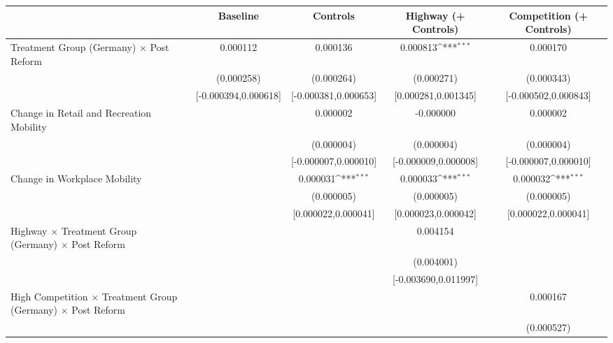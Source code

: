 {
\def\sym#1{\ifmmode^{#1}\else\(^{#1}\)\fi}
\begin{tabular}{l*{4}{c}}
\toprule
                    &\multicolumn{1}{c}{Baseline}&\multicolumn{1}{c}{Controls}&\multicolumn{1}{c}{Highway (+ Controls)}&\multicolumn{1}{c}{Competition (+ Controls)}\\
\midrule
Treatment Group (Germany) $\times$ Post Reform&    0.000112         &    0.000136         &    0.000813\sym{***}&    0.000170         \\
                    &  (0.000258)         &  (0.000264)         &  (0.000271)         &  (0.000343)         \\
                    &[-0.000394,0.000618]         &[-0.000381,0.000653]         &[0.000281,0.001345]         &[-0.000502,0.000843]         \\
Change in Retail and Recreation Mobility&                     &    0.000002         &   -0.000000         &    0.000002         \\
                    &                     &  (0.000004)         &  (0.000004)         &  (0.000004)         \\
                    &                     &[-0.000007,0.000010]         &[-0.000009,0.000008]         &[-0.000007,0.000010]         \\
Change in Workplace Mobility&                     &    0.000031\sym{***}&    0.000033\sym{***}&    0.000032\sym{***}\\
                    &                     &  (0.000005)         &  (0.000005)         &  (0.000005)         \\
                    &                     &[0.000022,0.000041]         &[0.000023,0.000042]         &[0.000022,0.000041]         \\
Highway $\times$ Treatment Group (Germany) $\times$ Post Reform&                     &                     &    0.004154         &                     \\
                    &                     &                     &  (0.004001)         &                     \\
                    &                     &                     &[-0.003690,0.011997]         &                     \\
High Competition $\times$ Treatment Group (Germany) $\times$ Post Reform&                     &                     &                     &    0.000167         \\
                    &                     &                     &                     &  (0.000527)         \\

\end{tabular}}
